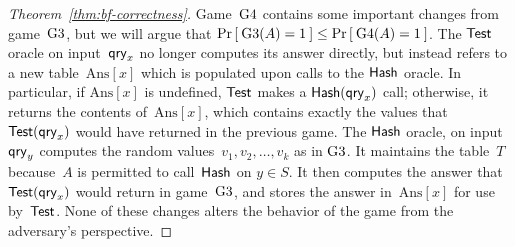 \begin{proof}[Theorem~\ref{thm:bf-correctness}]
Game~$\text{G4}$ contains some important changes from game~$\text{G3}$,
but we will argue that $\Pr\left[\: \text{G3}(A) = 1 \:\right] \leq \Pr\left[\: \text{G4}(A)
  = 1 \:\right]$. The $\mathsf{Test}$ oracle on input~$\mathsf{qry}_x$ no longer computes
its answer directly, but instead refers to a new table~$\mathrm{Ans}[x]$ which is populated upon calls to the
$\mathsf{Hash}$ oracle.  In particular, if $\mathrm{Ans}[x]$ is undefined, $\mathsf{Test}$ makes a $\mathsf{Hash}(\mathsf{qry}_x)$ call;
otherwise, it returns the contents of~$\mathrm{Ans}[x]$, which
contains exactly the values that~$\mathsf{Test}(\mathsf{qry}_x)$ would have
returned in the previous game.  The $\mathsf{Hash}$ oracle, on input~$\mathsf{qry}_y$ computes the random values~$v_1,v_2,\ldots,v_k$ as in
$\text{G3}$.  It maintains the table~$T$ because~$A$ is permitted to
call~$\mathsf{Hash}$ on $y \in S$.
It then computes the answer that~$\mathsf{Test}(\mathsf{qry}_x)$ would return in
game~$\text{G3}$, and stores the answer in~$\mathrm{Ans}[x]$ for use
by~$\mathsf{Test}$.  
None of these changes alters the behavior of the game from the
adversary's perspective.


\end{proof}
